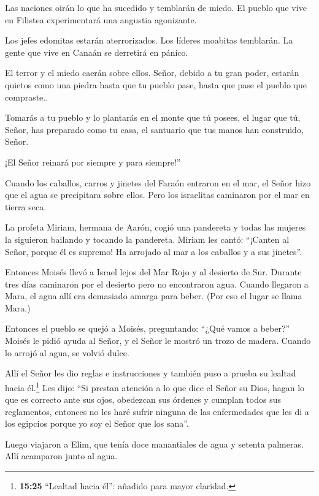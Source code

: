  Las naciones oirán lo que ha sucedido y temblarán de
miedo. El pueblo que vive en Filistea experimentará una angustia
agonizante.

 Los jefes edomitas estarán aterrorizados. Los líderes
moabitas temblarán. La gente que vive en Canaán se derretirá en pánico.

 El terror y el miedo caerán sobre ellos. Señor, debido a
tu gran poder, estarán quietos como una piedra hasta que tu pueblo pase,
hasta que pase el pueblo que compraste..

 Tomarás a tu pueblo y lo plantarás en el monte que tú
posees, el lugar que tú, Señor, has preparado como tu casa, el santuario
que tus manos han construido, Señor.

 ¡El Señor reinará por siempre y para siempre!''

 Cuando los caballos, carros y jinetes del Faraón entraron
en el mar, el Señor hizo que el agua se precipitara sobre ellos. Pero
los israelitas caminaron por el mar en tierra seca.

 La profeta Miriam, hermana de Aarón, cogió una pandereta y
todas las mujeres la siguieron bailando y tocando la pandereta.
 Miriam les cantó: ``¡Canten al Señor, porque él es
supremo! Ha arrojado al mar a los caballos y a sus jinetes''.

 Entonces Moisés llevó a Israel lejos del Mar Rojo y al
desierto de Sur. Durante tres días caminaron por el desierto pero no
encontraron agua.  Cuando llegaron a Mara, el agua allí era
demasiado amarga para beber. (Por eso el lugar se llama Mara.)

 Entonces el pueblo se quejó a Moisés, preguntando: ``¿Qué
vamos a beber?''  Moisés le pidió ayuda al Señor, y el
Señor le mostró un trozo de madera. Cuando lo arrojó al agua, se volvió
dulce.

Allí el Señor les dio reglas e instrucciones y también puso a prueba su
lealtad hacia él.\footnote{\textbf{15:25} ``Lealtad hacia él'': añadido
  para mayor claridad.}  Les dijo: ``Si prestan atención a
lo que dice el Señor su Dios, hagan lo que es correcto ante sus ojos,
obedezcan sus órdenes y cumplan todos sus reglamentos, entonces no les
haré sufrir ninguna de las enfermedades que les di a los egipcios porque
yo soy el Señor que los sana''.

 Luego viajaron a Elim, que tenía doce manantiales de agua
y setenta palmeras. Allí acamparon junto al agua.

